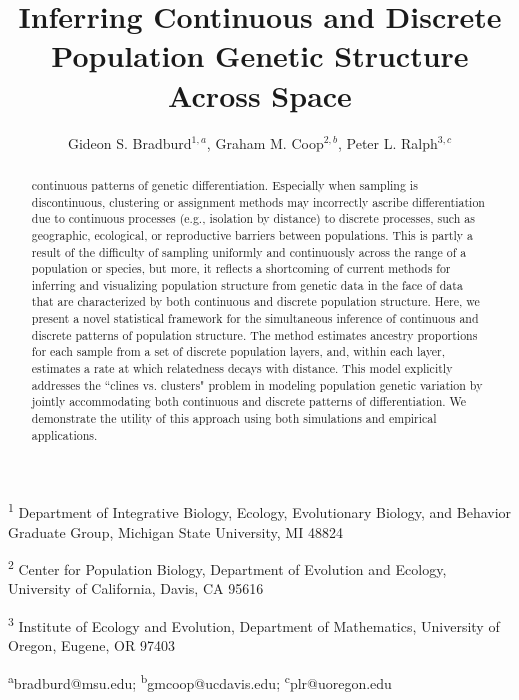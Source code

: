 \documentclass[12pt]{article}
\title{Inferring Continuous and Discrete Population Genetic Structure Across Space}
\date{\vspace{-5ex}}
\author{
Gideon S. Bradburd$^{1,a}$, 
Graham M. Coop$^{2,b}$,
Peter L. Ralph$^{3,c}$}
\newcommand{\gc}[1]{{\it\color{blue}{(#1)}}}
\begin{document}
\maketitle

\textsuperscript{1}
Department of Integrative Biology, 
Ecology, Evolutionary Biology, and Behavior Graduate Group,
Michigan State University, MI 48824

\textsuperscript{2}
Center for Population Biology,
Department of Evolution and Ecology, 
University of California, Davis, CA 95616

\textsuperscript{3}
Institute of Ecology and Evolution,
Department of Mathematics,
University of Oregon, Eugene, OR 97403

\textsuperscript{a}bradburd@msu.edu; 
\textsuperscript{b}gmcoop@ucdavis.edu;
\textsuperscript{c}plr@uoregon.edu\\\\\

\newpage
 
\begin{abstract}
\gc{A classic problem in population genetics is the characterization 
of discrete population structure in the presence of} 
continuous patterns of genetic differentiation.
Especially when sampling is discontinuous, 
clustering or assignment methods may incorrectly ascribe differentiation 
due to continuous processes (e.g., isolation by distance) 
to discrete processes, such as geographic, ecological, or reproductive barriers 
between populations.
This is partly a result of the difficulty of sampling uniformly and continuously 
across the range of a population or species, 
but more, it reflects a shortcoming of current methods for inferring and 
visualizing population structure from genetic data in the face of data 
that are characterized by both continuous and discrete population structure.
Here, we present a novel statistical framework for the simultaneous inference 
of continuous and discrete patterns of population structure.
The method estimates ancestry proportions for each 
sample from a set of discrete population layers, 
and, within each layer, estimates a rate at which relatedness decays with distance.
This model explicitly addresses the ``clines vs. clusters" problem in 
modeling population genetic variation by jointly accommodating both 
continuous and discrete patterns of differentiation. 
We demonstrate the utility of this approach using both simulations and empirical applications.
\end{abstract}
\end{document}
